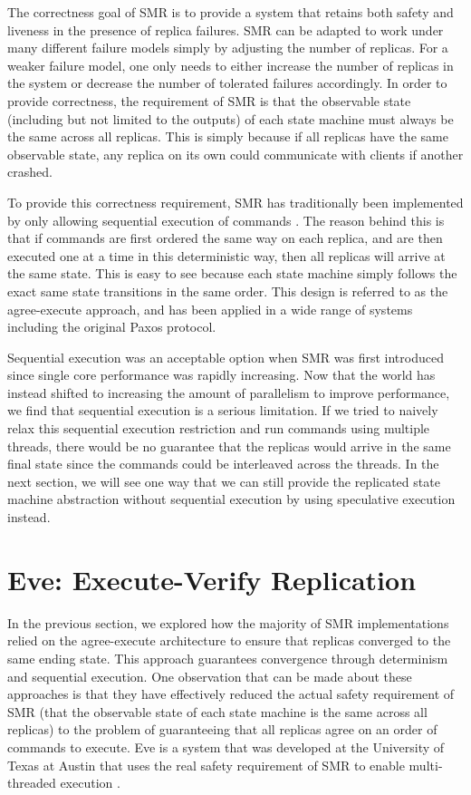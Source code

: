 \documentclass[11pt, oneside]{report}
\begin{document}
The correctness goal of SMR is to provide a system that retains both safety and liveness in the presence of replica failures. 
SMR can be adapted to work under many different failure models simply by adjusting the number of replicas. 
For a weaker failure model, one only needs to either increase the number of replicas in the system or decrease the number of tolerated failures accordingly. 
In order to provide correctness, the requirement of SMR is that the observable state (including but not limited to the outputs) of each state machine must always be the same across all replicas. 
This is simply because if all replicas have the same observable state, any replica on its own could communicate with clients if another crashed.

To provide this correctness requirement, SMR has traditionally been implemented by only allowing sequential execution of commands \cite{schneider}. 
The reason behind this is that if commands are first ordered the same way on each replica, and are then executed one at a time in this deterministic way, then all replicas will arrive at the same state. 
This is easy to see because each state machine simply follows the exact same state transitions in the same order. 
This design is referred to as the agree-execute approach, and has been applied in a wide range of systems including the original Paxos protocol.

Sequential execution was an acceptable option when SMR was first introduced since single core performance was rapidly increasing. 
Now that the world has instead shifted to increasing the amount of parallelism to improve performance, we find that sequential execution is a serious limitation. 
If we tried to naively relax this sequential execution restriction and run commands using multiple threads, there would be no guarantee that the replicas would arrive in the same final state since the commands could be interleaved across the threads. 
In the next section, we will see one way that we can still provide the replicated state machine abstraction without sequential execution by using speculative execution instead. 
 

\section{Eve: Execute-Verify Replication}

In the previous section, we explored how the majority of SMR implementations relied on the agree-execute architecture to ensure that replicas converged to the same ending state. 
This approach guarantees convergence through determinism and sequential execution. 
One observation that can be made about these approaches is that they have effectively reduced the actual safety requirement of SMR (that the observable state of each state machine is the same across all replicas) to the problem of guaranteeing that all replicas agree on an order of commands to execute. 
Eve is a system that was developed at the University of Texas at Austin that uses the real safety requirement of SMR to enable multi-threaded execution \cite{eve, manosThesis}.
\end{document}
